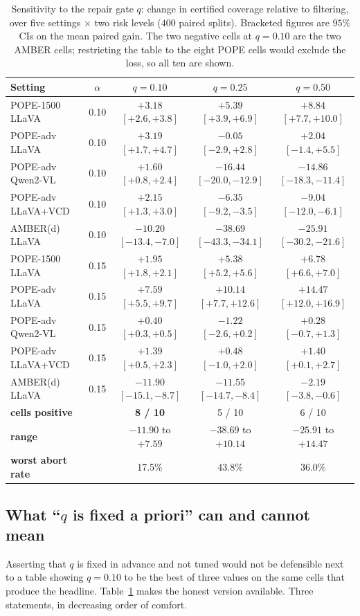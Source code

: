 \documentclass{article}
\theoremstyle{plain}
\theoremstyle{definition}
\theoremstyle{remark}
\begin{document}
\begin{table}[t]
\centering
\caption{Sensitivity to the repair gate $q$: change in certified coverage relative to
filtering, over five settings $\times$ two risk levels ($400$ paired splits). Bracketed
figures are $95\%$ CIs on the mean paired gain. The two negative cells at $q=0.10$ are the two
AMBER cells; restricting the table to the eight POPE cells would exclude the loss, so all ten
are shown.}
\label{tab:qsens}
\small
\begin{tabular}{lcccc}
\toprule
Setting & $\alpha$ & $q=0.10$ & $q=0.25$ & $q=0.50$\\
\midrule
POPE-1500 LLaVA    & 0.10 & $+3.18$ $[+2.6,+3.8]$  & $+5.39$ $[+3.9,+6.9]$   & $+8.84$ $[+7.7,+10.0]$\\
POPE-adv LLaVA     & 0.10 & $+3.19$ $[+1.7,+4.7]$  & $-0.05$ $[-2.9,+2.8]$   & $+2.04$ $[-1.4,+5.5]$\\
POPE-adv Qwen2-VL  & 0.10 & $+1.60$ $[+0.8,+2.4]$  & $-16.44$ $[-20.0,-12.9]$& $-14.86$ $[-18.3,-11.4]$\\
POPE-adv LLaVA+VCD & 0.10 & $+2.15$ $[+1.3,+3.0]$  & $-6.35$ $[-9.2,-3.5]$   & $-9.04$ $[-12.0,-6.1]$\\
AMBER(d) LLaVA     & 0.10 & $-10.20$ $[-13.4,-7.0]$& $-38.69$ $[-43.3,-34.1]$& $-25.91$ $[-30.2,-21.6]$\\
\midrule
POPE-1500 LLaVA    & 0.15 & $+1.95$ $[+1.8,+2.1]$  & $+5.38$ $[+5.2,+5.6]$   & $+6.78$ $[+6.6,+7.0]$\\
POPE-adv LLaVA     & 0.15 & $+7.59$ $[+5.5,+9.7]$  & $+10.14$ $[+7.7,+12.6]$ & $+14.47$ $[+12.0,+16.9]$\\
POPE-adv Qwen2-VL  & 0.15 & $+0.40$ $[+0.3,+0.5]$  & $-1.22$ $[-2.6,+0.2]$   & $+0.28$ $[-0.7,+1.3]$\\
POPE-adv LLaVA+VCD & 0.15 & $+1.39$ $[+0.5,+2.3]$  & $+0.48$ $[-1.0,+2.0]$   & $+1.40$ $[+0.1,+2.7]$\\
AMBER(d) LLaVA     & 0.15 & $-11.90$ $[-15.1,-8.7]$& $-11.55$ $[-14.7,-8.4]$ & $-2.19$ $[-3.8,-0.6]$\\
\midrule
\textbf{cells positive} & & \textbf{8 / 10} & 5 / 10 & 6 / 10\\
\textbf{range}          & & $-11.90$ to $+7.59$ & $-38.69$ to $+10.14$ & $-25.91$ to $+14.47$\\
\textbf{worst abort rate}& & 17.5\% & 43.8\% & 36.0\%\\
\bottomrule
\end{tabular}
\end{table}

\subsection{What ``$q$ is fixed a priori'' can and cannot mean}
\label{sec:qsel}
Asserting that $q$ is fixed in advance and not tuned would not be defensible next to a table
showing $q=0.10$ to be the best of three values on the same cells that produce the headline.
Table~\ref{tab:qsens} makes the honest version available. Three statements, in decreasing order
of comfort.
\end{document}

